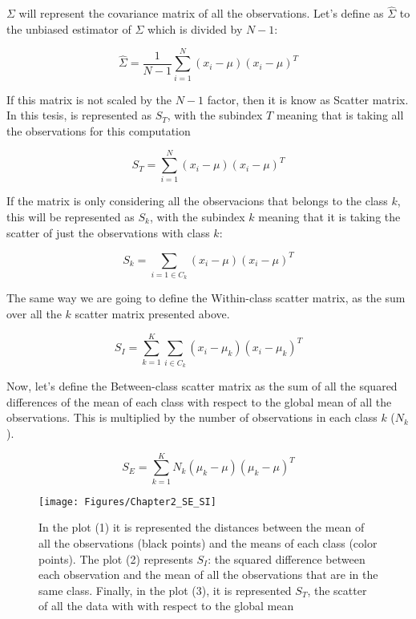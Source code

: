 $\Sigma$ will represent the covariance matrix of all the observations. Let's define as $\widehat{\Sigma}$ to the unbiased estimator of $\Sigma$ which is divided by $N-1$:

\begin{equation} \label{eq:2.1}
\widehat{\Sigma} = \frac{1}{N-1} \sum_{i=1}^{N}(x_i - \mu)(x_i - \mu)^T	
\end{equation}

If this matrix is not scaled by the $N-1$ factor, then it is know as Scatter matrix. In this tesis, is represented as $S_T$, with the subindex $T$ meaning that is taking all the observations for this computation

\begin{equation} \label{eq:2.2}
S_T = \sum_{i=1}^{N}(x_i - \mu)(x_i - \mu)^T	
\end{equation}

If the matrix is only considering all the observacions that belongs to the class $k$, this will be represented as $S_k$, with the subindex $k$ meaning that it is taking the scatter of just the observations with class $k$:

\begin{equation*}
S_k = \sum_{i=1 \in C_k} (x_i - \mu)(x_i - \mu)^T	
\end{equation*}

The same way we are going to define the Within-class scatter matrix, as the sum over all the $k$ scatter matrix presented above.

\begin{equation}\label{eq:2.3}
S_I = \sum_{k=1}^{K} 
					\sum_{i \in C_k}
 ({x_i-\mu_{k}})({x_i-\mu_{k}})^T 	
\end{equation}

Now, let's define the Between-class scatter matrix as the sum of all the squared differences of the mean of each class with respect to the global mean of all the observations. This is multiplied by the number of observations in each class $k$ ($N_k$).

\begin{equation} \label{eq:2.4}
S_E = \sum_{k = 1}^K N_k (\mu_k - \mu)(\mu_k - \mu)^T	
\end{equation}

\begin{figure}[!ht] \label{Fig1.1}
  \centering
	\texttt{[image: Figures/Chapter2\_SE\_SI]}	
  \caption[Distances considered in each scatter matrix.]
  {In the plot (1) it is represented the distances between the mean of all the observations (black points) and the means of each class (color points). The plot (2) represents $S_I$: the squared difference between each observation and the mean of all the observations that are in the same class. Finally, in the plot (3), it is represented $S_T$, the scatter of all the data with with respect to the global mean}
\end{figure}

